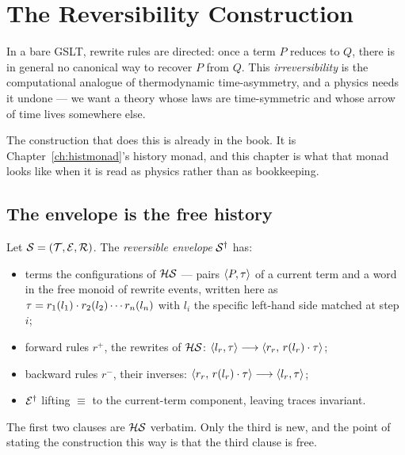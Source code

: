 \chapter{The Reversibility Construction}
\label{sec:reversibility}

In a bare GSLT, rewrite rules are directed: once a term $P$ reduces to $Q$,
there is in general no canonical way to recover $P$ from $Q$.  This
\emph{irreversibility} is the computational analogue of thermodynamic
time-asymmetry, and a physics needs it undone --- we want a theory whose laws
are time-symmetric and whose arrow of time lives somewhere else.

The construction that does this is already in the book.  It is
Chapter~\ref{ch:histmonad}'s history monad, and this chapter is what that monad
looks like when it is read as physics rather than as bookkeeping.

\section{The envelope is the free history}

\begin{construction}
\label{con:revenv}
Let $\mathcal{S} = (\mathcal{T}, \mathcal{E}, \mathcal{R})$.  The \emph{reversible envelope}
$\mathcal{S}^\dagger$ has:
\begin{itemize}[itemsep=2pt]
  \item terms the configurations of $\mathcal{H}\mathcal{S}$ --- pairs
        $\langle P, \tau \rangle$ of a current term and a word in the free
        monoid of rewrite events, written here as
        $\tau = r_1(l_1) \cdot r_2(l_2) \cdots r_n(l_n)$ with $l_i$ the
        specific left-hand side matched at step $i$;
  \item forward rules $r^+$, the rewrites of $\mathcal{H}\mathcal{S}$:
        $\langle l_r, \tau \rangle \longrightarrow
         \langle r_r,\, r(l_r) \cdot \tau \rangle$;
  \item backward rules $r^-$, their inverses:
        $\langle r_r,\, r(l_r) \cdot \tau \rangle \longrightarrow
         \langle l_r, \tau \rangle$;
  \item $\mathcal{E}^\dagger$ lifting $\equiv$ to the current-term component, leaving
        traces invariant.
\end{itemize}
\end{construction}

The first two clauses are $\mathcal{H}\mathcal{S}$ verbatim.  Only the third is new, and
the point of stating the construction this way is that the third clause is
free.

